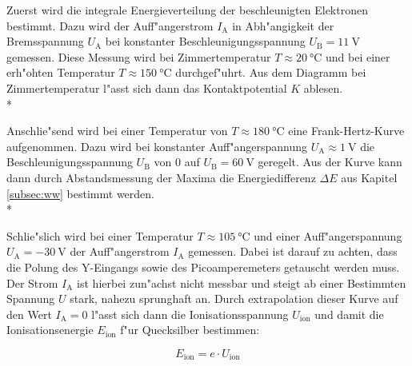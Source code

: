	Zuerst wird die integrale Energieverteilung der beschleunigten Elektronen bestimmt.
	Dazu wird der Auff"angerstrom $I_\mathrm{A}$ in Abh"angigkeit der Bremsspannung $U_\mathrm{A}$ bei konstanter Beschleunigungsspannung $U_\mathrm{B} = \SI{11}{\volt}$ gemessen.
	Diese Messung wird bei Zimmertemperatur $T \approx \SI{20}{\celsius}$ und bei einer erh"ohten Temperatur $T \approx \SI{150}{\celsius}$ durchgef"uhrt.
	Aus dem Diagramm bei Zimmertemperatur l"asst sich dann das Kontaktpotential $K$ ablesen.
	\\*

	Anschlie"send wird bei einer Temperatur von $T \approx \SI{180}{\celsius}$ eine Frank-Hertz-Kurve aufgenommen.
	Dazu wird bei konstanter Auff"angerspannung $U_\mathrm{A} \approx \SI{1}{\volt}$ die Beschleunigungsspannung $U_\mathrm{B}$ von 0 auf $U_\mathrm{B} = \SI{60}{\volt}$ geregelt.
	Aus der Kurve kann dann durch Abstandsmessung der Maxima die Energiedifferenz $\Delta E$ aus Kapitel \ref{subsec:ww} bestimmt werden.
	\\*

	Schlie"slich wird bei einer Temperatur $T \approx \SI{105}{\celsius}$ und einer Auff"angerspannung $U_\mathrm{A} = \SI{-30}{\volt}$ der Auff"angerstrom $I_\mathrm{A}$ gemessen.
	Dabei ist darauf zu achten, dass die Polung des Y-Eingangs sowie des Picoamperemeters getauscht werden muss.
	Der Strom $I_\mathrm{A}$ ist hierbei zun"achst nicht messbar und steigt ab einer Bestimmten Spannung $U$ stark, nahezu sprunghaft an.
	Durch extrapolation dieser Kurve auf den Wert $I_\mathrm{A} = 0$ l"asst sich dann die Ionisationsspannung $U_\mathrm{ion}$ und damit die Ionisationsenergie $E_\mathrm{ion}$ f"ur Quecksilber bestimmen:

	\begin{equation}
		E_\mathrm{ion} = e \cdot U_\mathrm{ion}
	\end{equation}
